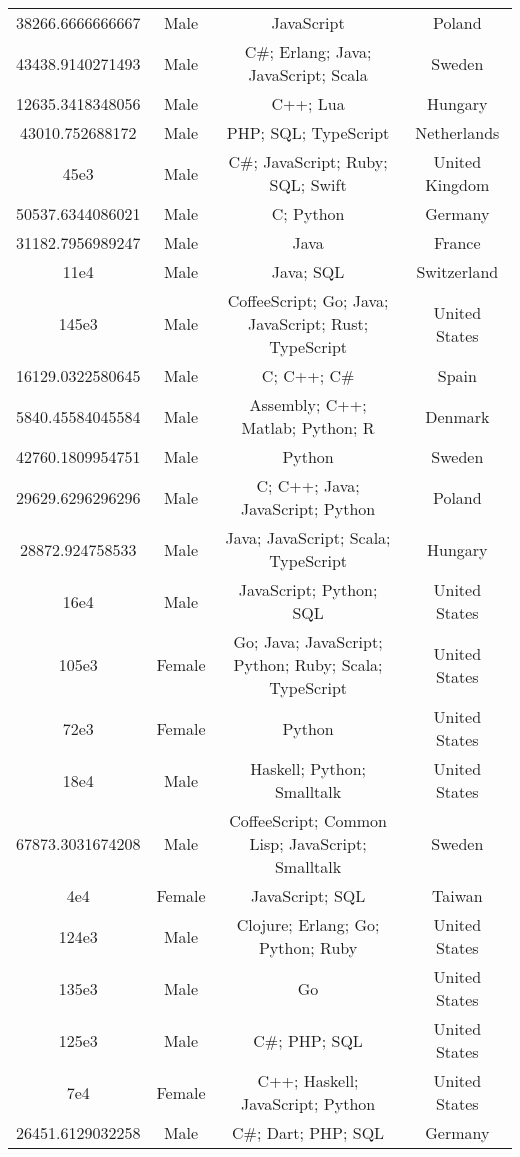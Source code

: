 \begin{center}
\begin{tabular}{ |c|c|c|c| }
38266.6666666667  &  Male  &  JavaScript  &  Poland  \\ 
43438.9140271493  &  Male  &  C\#; Erlang; Java; JavaScript; Scala  &  Sweden  \\ 
12635.3418348056  &  Male  &  C++; Lua  &  Hungary  \\ 
43010.752688172  &  Male  &  PHP; SQL; TypeScript  &  Netherlands  \\ 
45e3  &  Male  &  C\#; JavaScript; Ruby; SQL; Swift  &  United Kingdom  \\ 
50537.6344086021  &  Male  &  C; Python  &  Germany  \\ 
31182.7956989247  &  Male  &  Java  &  France  \\ 
11e4  &  Male  &  Java; SQL  &  Switzerland  \\ 
145e3  &  Male  &  CoffeeScript; Go; Java; JavaScript; Rust; TypeScript  &  United States  \\ 
16129.0322580645  &  Male  &  C; C++; C\#  &  Spain  \\ 
5840.45584045584  &  Male  &  Assembly; C++; Matlab; Python; R  &  Denmark  \\ 
42760.1809954751  &  Male  &  Python  &  Sweden  \\ 
29629.6296296296  &  Male  &  C; C++; Java; JavaScript; Python  &  Poland  \\ 
28872.924758533  &  Male  &  Java; JavaScript; Scala; TypeScript  &  Hungary  \\ 
16e4  &  Male  &  JavaScript; Python; SQL  &  United States  \\ 
105e3  &  Female  &  Go; Java; JavaScript; Python; Ruby; Scala; TypeScript  &  United States  \\ 
72e3  &  Female  &  Python  &  United States  \\ 
18e4  &  Male  &  Haskell; Python; Smalltalk  &  United States  \\ 
67873.3031674208  &  Male  &  CoffeeScript; Common Lisp; JavaScript; Smalltalk  &  Sweden  \\ 
4e4  &  Female  &  JavaScript; SQL  &  Taiwan  \\ 
124e3  &  Male  &  Clojure; Erlang; Go; Python; Ruby  &  United States  \\ 
135e3  &  Male  &  Go  &  United States  \\ 
125e3  &  Male  &  C\#; PHP; SQL  &  United States  \\ 
7e4  &  Female  &  C++; Haskell; JavaScript; Python  &  United States  \\ 
26451.6129032258  &  Male  &  C\#; Dart; PHP; SQL  &  Germany  \\ 

\end{tabular}
\end{center}
